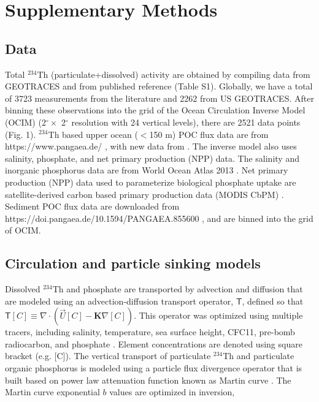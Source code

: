 \section{Supplementary Methods}
\label{sec:meth}

\subsection{Data}
Total $^{234}$Th (particulate+dissolved) activity are obtained by compiling data from GEOTRACES \citep{mawji2015,schlitzer2018} and from published reference (Table S1).
Globally, we have a total of 3723 measurements from the literature and 2262 from US GEOTRACES.
After binning these observations into the grid of the Ocean Circulation Inverse Model (OCIM) (2$^\circ\times$ 2$^\circ$ resolution with 24 vertical levels), there are 2521 data points (Fig. 1).
$^{234}$Th based upper ocean ($<$150 m) POC flux data are from \\https://www.pangaea.de/ \citep{LeMoigne2013}, with new data from \citet{Black2017}.
The inverse model also uses salinity, phosphate, and net primary production (NPP) data.
The salinity and inorganic phosphorus data are from World Ocean Atlas 2013 \citep{Zweng2013,Garcia2014}.
Net primary production (NPP) data used to parameterize biological phosphate uptake are satellite-derived carbon based primary production data (MODIS CbPM) \citep{Westberry2008}.
Sediment POC flux data are downloaded from https://doi.pangaea.de/10.1594/PANGAEA.855600 \citep{mouw2016}, and are binned into the grid of OCIM.

\subsection{Circulation and particle sinking models}
Dissolved $^{234}$Th and phosphate are transported by advection and diffusion that are modeled using an advection-diffusion transport operator, $\boldsymbol{\mathsf{T}}$, defined so that $\boldsymbol{\mathsf{T}}[C] \equiv \nabla \cdot \left(\vec{U}[C]-\mathbf{K}\nabla [C]\right)$.
This operator was optimized using multiple tracers, including salinity, temperature, sea surface height, CFC11, pre-bomb radiocarbon, and phosphate \citep{DeVries2011,Primeau2013}.
Element concentrations are denoted using square bracket (e.g. [C]).
The vertical transport of particulate $^{234}$Th and particulate organic phosphorus is modeled using a particle flux divergence operator that is built based on power law attenuation function known as Martin curve \citep{fu2017}.
The Martin curve exponential $b$ values are optimized in inversion,

